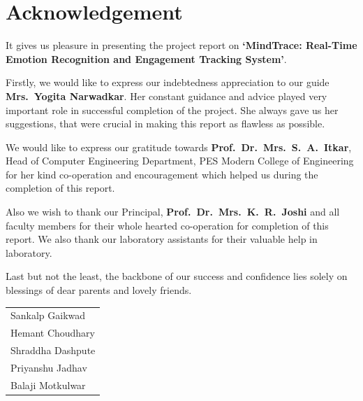 \chapter*{Acknowledgement}
\thispagestyle{plain}

It gives us pleasure in presenting the project report on
\textbf{`MindTrace: Real-Time Emotion Recognition and Engagement Tracking System'}.

Firstly, we would like to express our indebtedness appreciation to our guide
\textbf{Mrs.\ Yogita Narwadkar}. Her constant guidance and advice played very
important role in successful completion of the project. She always gave us her
suggestions, that were crucial in making this report as flawless as possible.

We would like to express our gratitude towards \textbf{Prof.\ Dr.\ Mrs.\ S.\ A.\
Itkar}, Head of Computer Engineering Department, PES Modern College of
Engineering for her kind co-operation and encouragement which helped us
during the completion of this report.

Also we wish to thank our Principal, \textbf{Prof.\ Dr.\ Mrs.\ K.\ R.\ Joshi} and
all faculty members for their whole hearted co-operation for completion of
this report. We also thank our laboratory assistants for their valuable help
in laboratory.

Last but not the least, the backbone of our success and confidence lies solely
on blessings of dear parents and lovely friends.

\begin{flushright}
\begin{tabular}{l}
  Sankalp Gaikwad \\[6pt]
  Hemant Choudhary \\[6pt]
  Shraddha Dashpute \\[6pt]
  Priyanshu Jadhav \\[6pt]
  Balaji Motkulwar \\
\end{tabular}
\end{flushright}
